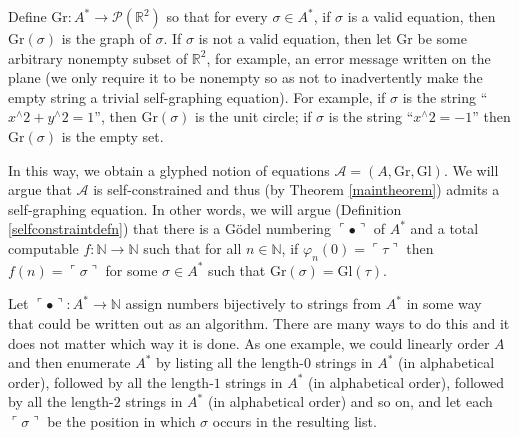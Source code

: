 \documentclass[table, svgnames, dvipsnames, letterpaper, 11pt]{report}
\theoremstyle{remark}
\begin{document}
Define $\mathrm{Gr}:A^*\to\mathscr P(\mathbb R^2)$ so that for every
$\sigma\in A^*$, if $\sigma$ is a valid equation, then $\mathrm{Gr}(\sigma)$
is the graph of $\sigma$. If $\sigma$ is not a valid equation, then let
$\mathrm{Gr}$ be some arbitrary nonempty subset of $\mathbb R^2$, for example,
an error message written on the plane (we only require it to be nonempty so
as not to inadvertently make the empty string a trivial self-graphing equation).
For example, if $\sigma$ is the string ``$x{}^\wedge2+y{}^\wedge2=1$'', then
$\mathrm{Gr}(\sigma)$ is the unit circle; if $\sigma$ is the string
``$x{}^\wedge 2=-1$'' then $\mathrm{Gr}(\sigma)$ is the empty set.

In this way, we obtain a glyphed notion of equations
$\mathcal A=(A,\mathrm{Gr},\mathrm{Gl})$. We will argue that $\mathcal A$
is self-constrained and thus (by Theorem \ref{maintheorem})
admits a self-graphing equation. In other words, we will argue
(Definition \ref{selfconstraintdefn}) that there is a G\"odel
numbering $\ulcorner\bullet\urcorner$ of $A^*$ and a total computable
$f:\mathbb N\to\mathbb N$ such that for all $n\in\mathbb N$, if
$\varphi_n(0)=\ulcorner\tau\urcorner$
then $f(n)=\ulcorner\sigma\urcorner$ for some $\sigma\in A^*$ such that
$\mathrm{Gr}(\sigma)=\mathrm{Gl}(\tau)$.

Let $\ulcorner\bullet\urcorner:A^*\to \mathbb N$ assign numbers bijectively
to strings from $A^*$ in some way that could be written out as an algorithm.
There are many ways to do this and it does not matter which way it is done.
As one example, we could linearly order $A$ and then enumerate $A^*$ by
listing all the length-$0$ strings in $A^*$ (in alphabetical order), followed
by all the length-$1$ strings in $A^*$ (in alphabetical order),
followed by all the length-$2$ strings in
$A^*$ (in alphabetical order) and so on,
and let each $\ulcorner \sigma\urcorner$ be the position
in which $\sigma$ occurs in the resulting list.
\end{document}
